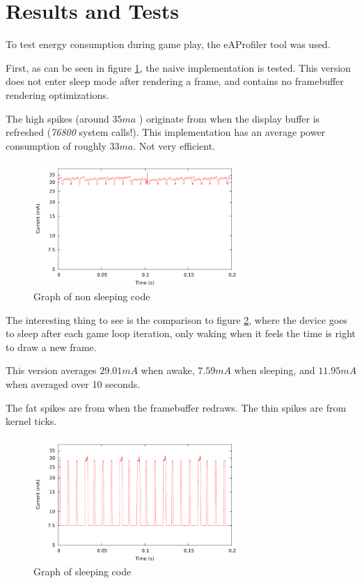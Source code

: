 \section{Results and Tests}
To test energy consumption during game play, the eAProfiler tool was used.

First, as can be seen in figure \ref{fig:nosleep},
the naive implementation is tested.
This version does not enter sleep mode after rendering a frame,
and contains no framebuffer rendering optimizations.

The high spikes (around $ 35 ma $ ) originate from when the display buffer is
refreshed (\emph{76800} system calls!). This implementation has an average
power consumption of roughly $ 33 ma $. Not very efficient.

\begin{figure}[H]
\centering
\includegraphics[width=0.7\textwidth]{figures/nosleep.pdf}
\caption{Graph of non sleeping code}
\label{fig:nosleep}
\end{figure}

The interesting thing to see is the comparison to figure
\ref{fig:sleep}, where the device goes to sleep after each
game loop iteration, only waking when it feels the time is
right to draw a new frame.

This version averages $ 29.01 mA $ when awake,
$ 7.59 mA $ when sleeping,
and $ 11.95 mA $ when averaged over 10 seconds.

The fat spikes are from when the framebuffer redraws.
The thin spikes are from kernel ticks.

\begin{figure}[H]
\centering
\includegraphics[width=0.7\textwidth]{figures/sleep.pdf}
\caption{Graph of sleeping code}
\label{fig:sleep}
\end{figure}

